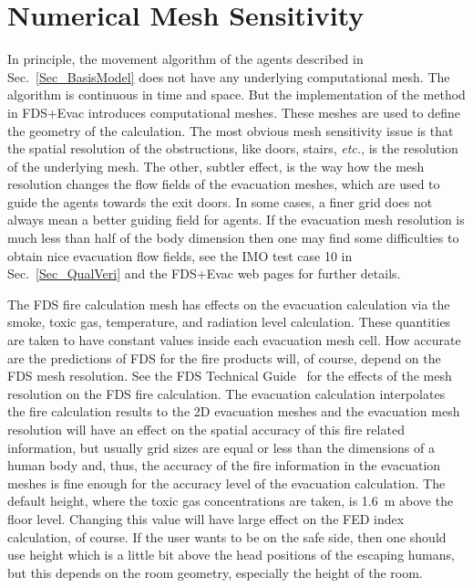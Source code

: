 \documentclass[12pt,a4paper,final,twoside]{stylevk}
\begin{document}
\section{Numerical Mesh Sensitivity}\label{Sec_GridSensi}

\noindent In principle, the movement algorithm of the agents described
in Sec.~\ref{Sec_BasisModel} does not have any underlying
computational mesh.  The algorithm is continuous in time and space.
But the implementation of the method in FDS+Evac introduces
computational meshes.  These meshes are used to define the geometry of
the calculation.  The most obvious mesh sensitivity issue is that the
spatial resolution of the obstructions, like doors, stairs,
\emph{etc.}, is the resolution of the underlying mesh.  The other,
subtler effect, is the way how the mesh resolution changes the flow
fields of the evacuation meshes, which are used to guide the agents
towards the exit doors.  In some cases, a finer grid does not always
mean a better guiding field for agents.  If the evacuation mesh
resolution is much less than half of the body dimension then one may
find some difficulties to obtain nice evacuation flow fields, see the
IMO test case 10 in Sec.~\ref{Sec_QualVeri} and the FDS+Evac web pages
for further details.


The FDS fire calculation mesh has effects on the evacuation
calculation via the smoke, toxic gas, temperature, and radiation level
calculation.  These quantities are taken to have constant values
inside each evacuation mesh cell.  How accurate are the predictions of
FDS for the fire products will, of course, depend on the FDS mesh
resolution.  See the FDS Technical Guide~\cite{FDS_Manual,
  FDS_VVGuide1, FDS_VVGuide2} for the effects of the mesh resolution
on the FDS fire calculation.  The evacuation calculation interpolates
the fire calculation results to the 2D evacuation meshes and the
evacuation mesh resolution will have an effect on the spatial accuracy
of this fire related information, but usually grid sizes are equal or
less than the dimensions of a human body and, thus, the accuracy of
the fire information in the evacuation meshes is fine enough for the
accuracy level of the evacuation calculation.  The default height,
where the toxic gas concentrations are taken, is 1.6~m above the floor
level.  Changing this value will have large effect on the FED index
calculation, of course.  If the user wants to be on the safe side,
then one should use height which is a little bit above the head
positions of the escaping humans, but this depends on the room
geometry, especially the height of the room.
\end{document}
